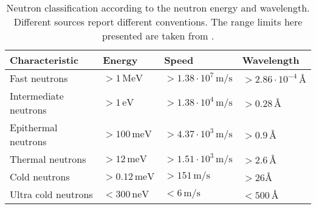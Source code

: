 \begin{table}[ht]
  \centering
  \caption[Neutron classification according to the neutron energy and wavelength]
  {Neutron classification according to the neutron energy and wavelength. Different sources report different conventions. The range  limits here presented are taken from \cite{psiNeutronRange}.}
  \label{chap1:tab:neutronsT}
  \begin{tabularx}{\linewidth}{lXXX}
    \toprule
    Characteristic        & Energy               & Speed                              & Wavelength                                    \\
    \midrule
    Fast neutrons         & $>1\,\mathrm{MeV}$   & $>1.38\cdot 10^{7}\,\mathrm{m/s}$  & $>2.86\cdot 10^{-4}\,\mathrm{\si{\angstrom}}$ \\
    Intermediate neutrons & $>1\,\mathrm{eV}$    & $>1.38 \cdot 10^{4}\,\mathrm{m/s}$ & $>0.28\,\mathrm{\si{\angstrom}}$              \\
    Epithermal neutrons   & $>100\,\mathrm{meV}$ & $>4.37 \cdot 10^{3}\,\mathrm{m/s}$ & $>0.9\,\mathrm{\si{\angstrom}}$               \\
    Thermal neutrons      & $>12\,\mathrm{meV}$   & $>1.51 \cdot 10^{3}\,\mathrm{m/s}$ & $>2.6\,\mathrm{\si{\angstrom}}$              \\
    Cold neutrons         & $>0.12\,\mathrm{meV}$ & $>151\,\mathrm{m/s}$               & $>26\mathrm{\si{\angstrom}}$                  \\
    Ultra cold neutrons   & $<300\,\mathrm{neV}$ & $<6\,\mathrm{m/s}$                 & $<500\,\mathrm{\si{\angstrom}}$               \\
    \bottomrule
  \end{tabularx}
\end{table}
